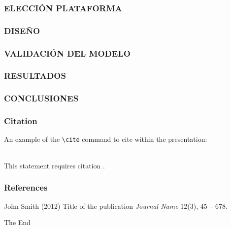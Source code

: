 \documentclass{beamer}
\begin{document}
\begin{frame}
\frametitle{ELECCIÓN PLATAFORMA}

\end{frame}

\begin{frame}
\frametitle{DISEÑO}

\end{frame}

\begin{frame}
\frametitle{VALIDACIÓN DEL MODELO}

\end{frame}

\begin{frame}
\frametitle{RESULTADOS}

\end{frame}

\begin{frame}
\frametitle{CONCLUSIONES}

\end{frame}



\begin{frame}[fragile] %
\frametitle{Citation}
An example of the \verb|\cite| command to cite within the presentation:\\~

This statement requires citation \cite{p1}.
\end{frame}


\begin{frame}
\frametitle{References}
\footnotesize{
\begin{thebibliography}{99} %
 John Smith (2012)
\newblock Title of the publication
\newblock \emph{Journal Name} 12(3), 45 -- 678.
\end{thebibliography}
}
\end{frame}


\begin{frame}
\Huge{\centerline{The End}}
\end{frame}

\end{document}
